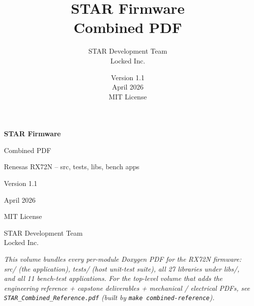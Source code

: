 \documentclass[11pt,letterpaper]{article}
\title{\Huge\bfseries STAR Firmware\\[0.4em]\Large Combined PDF}
\author{STAR Development Team \\ Locked Inc.}
\date{Version 1.1 \\ April 2026 \\ MIT License}
\begin{document}
\begin{titlepage}
\centering
\vspace*{2.5cm}

{\Huge\bfseries STAR Firmware\par}
\vspace{0.3cm}
{\LARGE Combined PDF\par}
\vspace{0.5cm}
{\large Renesas RX72N -- src, tests, libs, bench apps\par}

\vfill

{\large Version 1.1\par}
{\large April 2026\par}
\vspace{0.4cm}
{\large MIT License\par}

\vfill

{\normalsize STAR Development Team\\Locked Inc.\par}
\vspace{0.8cm}

{\small\itshape This volume bundles every per-module Doxygen PDF for the
RX72N firmware: src/ (the application), tests/ (host unit-test suite),
all 27 libraries under libs/, and all 11 bench-test applications. For
the top-level volume that adds the engineering reference + capstone
deliverables + mechanical / electrical PDFs, see
\texttt{STAR\_Combined\_Reference.pdf} (built by
\texttt{make combined-reference}).\par}
\end{titlepage}

\tableofcontents
\newpage


\end{document}
